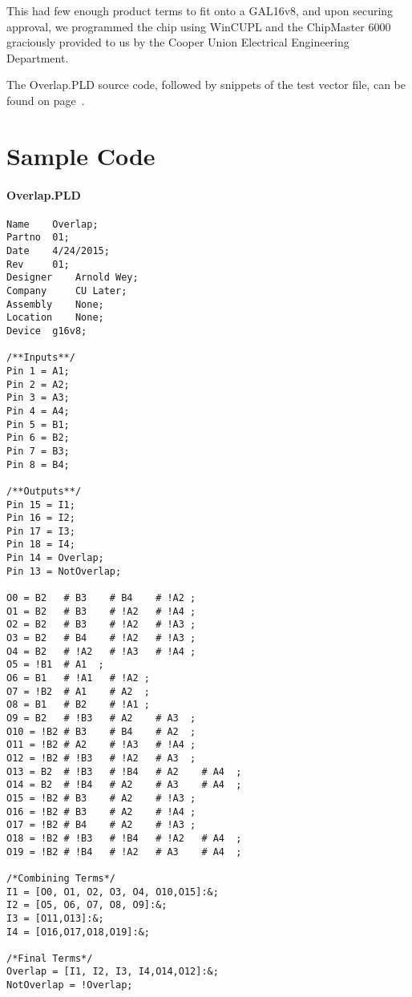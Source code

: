 \documentclass[letterpaper,titlepage,oneside]{article}
\begin{document}
This had few enough product terms to fit onto a GAL16v8, and upon securing approval, we programmed the chip using WinCUPL and the ChipMaster 6000 graciously provided to us by the Cooper Union Electrical Engineering Department.

The Overlap.PLD source code, followed by snippets of the test vector file, can be found on page~\pageref{code:Overlap}.

\pagebreak
\section{Sample Code}

\paragraph*{Overlap.PLD\\}
\label{code:Overlap}
\begin{lstlisting}
Name 	Overlap;
Partno 	01;
Date 	4/24/2015;
Rev 	01;
Designer 	Arnold Wey;
Company 	CU Later;
Assembly 	None;
Location 	None;
Device 	g16v8;

/**Inputs**/
Pin 1 = A1;
Pin 2 = A2;
Pin 3 = A3;
Pin 4 = A4;
Pin 5 = B1;
Pin 6 = B2;
Pin 7 = B3;
Pin 8 = B4;

/**Outputs**/
Pin 15 = I1;
Pin 16 = I2;
Pin 17 = I3;
Pin 18 = I4;
Pin 14 = Overlap;
Pin 13 = NotOverlap;

O0 = B2   # B3    # B4    # !A2 ;
O1 = B2   # B3    # !A2   # !A4 ;
O2 = B2   # B3    # !A2   # !A3 ;
O3 = B2   # B4    # !A2   # !A3 ;
O4 = B2   # !A2   # !A3   # !A4 ;
O5 = !B1  # A1  ;
O6 = B1   # !A1   # !A2 ;
O7 = !B2  # A1    # A2  ;
O8 = B1   # B2    # !A1 ;
O9 = B2   # !B3   # A2    # A3  ;
O10 = !B2 # B3    # B4    # A2  ;
O11 = !B2 # A2    # !A3   # !A4 ;
O12 = !B2 # !B3   # !A2   # A3  ;
O13 = B2  # !B3   # !B4   # A2    # A4  ;
O14 = B2  # !B4   # A2    # A3    # A4  ;
O15 = !B2 # B3    # A2    # !A3 ;
O16 = !B2 # B3    # A2    # !A4 ;
O17 = !B2 # B4    # A2    # !A3 ;
O18 = !B2 # !B3   # !B4   # !A2   # A4  ;
O19 = !B2 # !B4   # !A2   # A3    # A4  ;

/*Combining Terms*/
I1 = [O0, O1, O2, O3, O4, O10,O15]:&;
I2 = [O5, O6, O7, O8, O9]:&;
I3 = [O11,O13]:&;
I4 = [O16,O17,O18,O19]:&;

/*Final Terms*/
Overlap = [I1, I2, I3, I4,O14,O12]:&;
NotOverlap = !Overlap;



\end{lstlisting}
\end{document}
